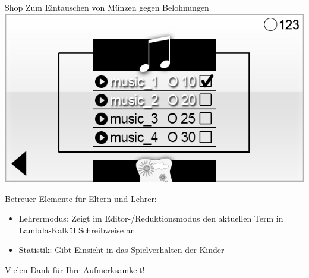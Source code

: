 \documentclass[18pt]{beamer}
\begin{document}
\begin{frame}{Shop}
	Zum Eintauschen von Münzen gegen Belohnungen
	\includegraphics[scale=0.5]{../gui/_jpeg/shop_popup}
\end{frame}

\begin{frame}{Betreuer}
	Elemente für Eltern und Lehrer:
	\begin{itemize}[<+->]
	\item Lehrermodus: Zeigt im Editor-/Reduktionsmodus den aktuellen Term in Lambda-Kalkül Schreibweise an
	\item Statistik: Gibt Einsicht in das Spielverhalten der Kinder
	\end{itemize}
\end{frame}

\begin{frame}
	\centering
	\huge Vielen Dank für Ihre Aufmerksamkeit!
\end{frame}
\end{document}

